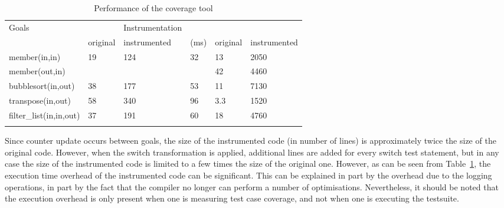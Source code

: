 \documentclass[british]{llncs}
\providecommand{\tabularnewline}{\\}
\begin{document}
\begin{table}[h]
\centering{}\begin{tabular}{|l||>{\centering}p{0.5in}|>{\centering}p{0.8in}|>{\centering}p{0.9in}|>{\centering}p{0.5in}|>{\centering}p{0.8in}|}
\hline 
{\scriptsize Goals} & \multicolumn{2}{c|}{{\scriptsize Code size (lines)}} & {\scriptsize Instrumentation } & \multicolumn{2}{c|}{{\scriptsize Execution (ms)}}\tabularnewline
\cline{2-3} \cline{5-6} 
 & {\scriptsize original} & {\scriptsize instrumented} & {\scriptsize (ms)} & {\scriptsize original} & {\scriptsize instrumented}\tabularnewline
\hline
\hline 
{\scriptsize member(in,in)} & {\scriptsize 19} & {\scriptsize 124} & {\scriptsize 32} & {\scriptsize 13} & {\scriptsize 2050}\tabularnewline
\cline{1-1} \cline{5-6} 
{\scriptsize member(out,in)} &  &  &  & {\scriptsize 42} & {\scriptsize 4460}\tabularnewline
\hline 
{\scriptsize bubblesort(in,out)} & {\scriptsize 38} & {\scriptsize 177} & {\scriptsize 53} & {\scriptsize 11} & {\scriptsize 7130}\tabularnewline
\hline 
{\scriptsize transpose(in,out)} & {\scriptsize 58} & {\scriptsize 340} & {\scriptsize 96} & {\scriptsize 3.3} & {\scriptsize 1520}\tabularnewline
\hline 
{\scriptsize filter\_list(in,in,out)} & {\scriptsize 37} & {\scriptsize 191} & {\scriptsize 60} & {\scriptsize 18} & {\scriptsize 4760}\tabularnewline
\hline 
\multicolumn{1}{l}{} & \multicolumn{1}{>{\centering}p{0.5in}}{} & \multicolumn{1}{>{\centering}p{0.8in}}{} & \multicolumn{1}{>{\centering}p{0.9in}}{} & \multicolumn{1}{>{\centering}p{0.5in}}{} & \multicolumn{1}{>{\centering}p{0.8in}}{}\tabularnewline
\end{tabular}\caption{\label{tab:Performance-coverage}Performance of the coverage tool}
\end{table}

Since counter update occurs between goals, the size of the instrumented code (in number of lines) is approximately twice the size of the original code. However, when the switch transformation is applied, additional lines are added
for every switch test statement, but in any case the size of the instrumented code is limited to a few times the size of the original one. However, as can be seen from Table~\ref{tab:Performance-coverage}, the execution time overhead of the instrumented code can be significant. This can be explained in part by the overhead due to the logging operations, in part by the fact that the compiler no longer can perform a number of optimisations. Nevertheless, it should be noted
that the execution overhead is only present when one is measuring test case coverage, and not when one is executing the testsuite. 
\end{document}
